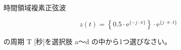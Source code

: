 時間領域複素正弦波

\[
z(t) =  \left \{ 0.5 \cdot \textrm{e}^{\{-j \cdot \pi \}} \right \} \cdot \textrm{e}^{\{ j \cdot \pi \cdot t \}}
\]

\bigskip
\noindent の周期 $\textrm{T}$ [秒]を選択肢 a〜d の中から1つ選びなさい。
